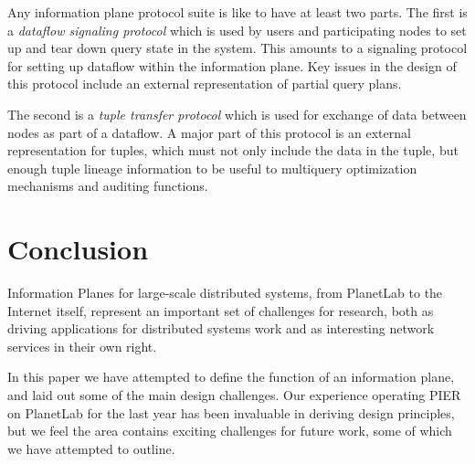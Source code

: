 \documentclass[10pt,twocolumn]{MyTightStyle}
\def\IP{information plane\xspace}
\begin{document}
Any \IP protocol suite is like to have at least two parts.  The first is a
\emph{dataflow signaling protocol} which is used by users and participating
nodes to set up and tear down query state in the system.  This amounts
to a signaling protocol for setting up dataflow within the \IP.  Key
issues in the design of this protocol include an external
representation of partial query plans.

The second is a \emph{tuple transfer protocol} which is used for
exchange of data between nodes as part of a dataflow.  A major part of this
protocol is an external representation for tuples, which must not only
include the data in the tuple, but enough tuple lineage information to
be useful to multiquery optimization mechanisms and auditing
functions. 

\section{Conclusion}
\label{sec:conclusion}

Information Planes for large-scale distributed systems, from PlanetLab
to the Internet itself, represent an important set of challenges for
research, both as driving applications for distributed systems work
and as interesting network services in their own right. 

In this paper we have attempted to define the function of an \IP, and
laid out some of the main design challenges.   Our experience
operating PIER on PlanetLab for the last year has been invaluable in
deriving design principles, but we feel the area contains exciting
challenges for future work, some of which we have attempted to outline. 


\end{document}
